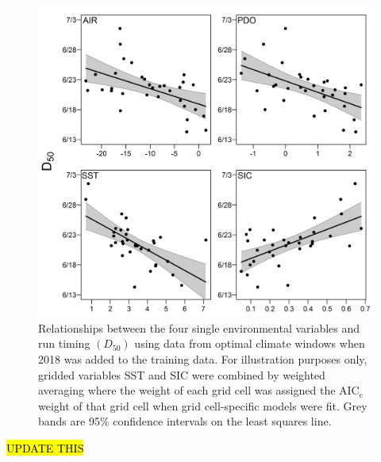 \documentclass[12pt,]{book}
\theoremstyle{definition}
\theoremstyle{definition}
\theoremstyle{definition}
\theoremstyle{remark}
\begin{document}
\begin{figure}
  \centering
  \includegraphics{img/Ch2/relationships.png}
  \caption{Relationships between the four single environmental variables and run timing $\left(D_{50}\right)$ using data from optimal climate windows when 2018 was added to the training data. For illustration purposes only, gridded variables SST and SIC were combined by weighted averaging where the weight of each grid cell was assigned the $\text{AIC}_{\text{c}}$ weight of that grid cell when grid cell-specific models were fit. Grey bands are 95$\%$ confidence intervals on the least squares line.}
  \label{fig:relationships}
\end{figure}

\clearpage

\hl{UPDATE THIS}
\end{document}
